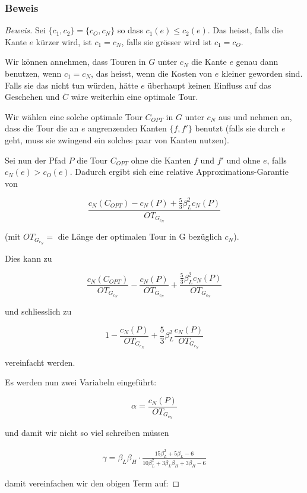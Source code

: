 \documentclass[a4paper,11pt]{scrreprt}
\begin{document}
\subsubsection{Beweis}

\begin{proof}[Beweis]
Sei $\{c_1, c_2\} = \{c_O, c_N\}$ so dass $c_1(e) \le c_2(e)$. Das heisst, falls die Kante $e$ kürzer wird, ist $c_1 = c_N$, falls sie grösser wird ist $c_1 = c_O$.

Wir können annehmen, dass Touren in $G$ unter $c_N$ die Kante $e$ genau dann benutzen, wenn $c_1 = c_N$, das heisst, wenn die Kosten von $e$ kleiner geworden sind. Falls sie das nicht tun würden, hätte $e$ überhaupt keinen Einfluss auf das Geschehen und $\overline{C}$ wäre weiterhin eine optimale Tour. 

Wir wählen eine solche optimale Tour $C_{OPT}$ in $G$ unter $c_N$ aus und nehmen an, dass die Tour die an $e$ angrenzenden Kanten $\{f, f'\}$ benutzt (falls sie durch $e$ geht, muss sie zwingend ein solches paar von Kanten nutzen).

Sei nun der Pfad $P$ die Tour $C_{OPT}$ ohne die Kanten $f$ und $f'$ und ohne $e$, falls $c_N(e) > c_O(e)$. Dadurch ergibt sich eine relative Approximations-Garantie von 

\[ \frac{c_N(C_{OPT}) - c_N(P) + \frac{5}{3}\beta_L^2 c_N(P)}{OT_{G_{c_N}}} \]

(mit $OT_{G_{c_N}} =$ die Länge der optimalen Tour in G bezüglich $c_N$). 

Dies kann zu

\[ \frac{c_N(C_{OPT})}{OT_{G_{c_N}}} - \frac{c_N(P)}{OT_{G_{c_N}}} + \frac{\frac{5}{3}\beta_L^2 c_N(P)}{OT_{G_{c_N}}} \]

und schliesslich zu

\[ 1 - \frac{c_N(P)}{OT_{G_{c_N}}} + \frac{5}{3}\beta_L^2 \frac{c_N(P)}{OT_{G_{c_N}}} \]

vereinfacht werden.

Es werden nun zwei Variabeln eingeführt:

\[ \alpha = \frac{c_N(P)}{OT_{G_{c_N}}} \]

und damit wir nicht so viel schreiben müssen

\begin{align}
\gamma = \beta_L\beta_H \cdot \frac{15\beta_L^2 + 5\beta_L - 6}{10\beta_L^2 + 3\beta_L\beta_H + 3\beta_H -6}
\label{eq:gamma}
\end{align}

damit vereinfachen wir den obigen Term auf:


\end{proof}
\end{document}
